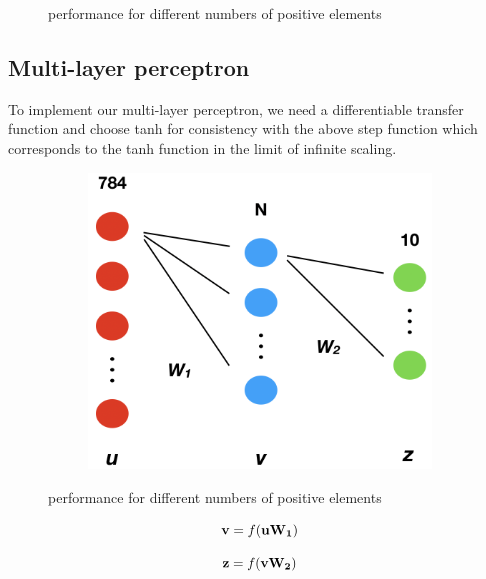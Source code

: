 \documentclass{article}
\begin{document}
\begin{figure}[h]
\begin{subfigure}[t]{0.32\linewidth}
	\end{subfigure}%

\caption{performance for different numbers of positive elements}
\label{fig:nplus}
\end{figure}

\subsection*{Multi-layer perceptron}

To implement our multi-layer perceptron, we need a differentiable transfer function and choose tanh for consistency with the above step function which corresponds to the tanh function in the limit of infinite scaling.

\begin{figure}[h]
	\centering
	\begin{subfigure}[t]{0.32\linewidth}
		\centering
		\includegraphics[width = 1.0\linewidth, trim={0 0 0 0}, clip=true]{figures/network_structure.png}
	\end{subfigure}%
\caption{performance for different numbers of positive elements}
\label{fig:nplus}
\end{figure}

\begin{equation}
{\bf v} = f( {\bf u W_1} )
\end{equation}

\begin{equation}\label{eq:layer2}
{\bf z} = f( {\bf v W_2} )
\end{equation}
\end{document}
